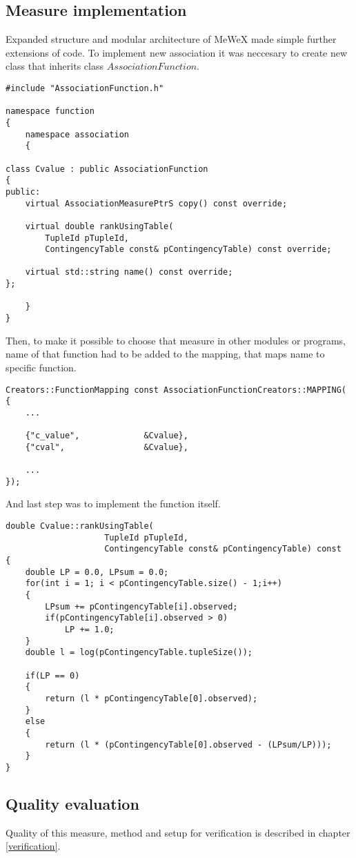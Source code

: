 \subsection{Measure implementation}
Expanded structure and modular architecture of MeWeX made simple further extensions of code. To implement new association 
it was neccesary to create new class that inherits class \(AssociationFunction\).
\begin{lstlisting}
#include "AssociationFunction.h"

namespace function
{
    namespace association
    {

class Cvalue : public AssociationFunction
{
public:
    virtual AssociationMeasurePtrS copy() const override;

    virtual double rankUsingTable(
        TupleId pTupleId,
        ContingencyTable const& pContingencyTable) const override;

    virtual std::string	name() const override;
};

    }
}
\end{lstlisting}
Then, to make it possible to choose that measure in other modules or programs, name of that function had to be added to the mapping,
that maps name to specific function.
\begin{lstlisting}
Creators::FunctionMapping const AssociationFunctionCreators::MAPPING(
{
    ...

    {"c_value",				&Cvalue},
    {"cval",				&Cvalue},

    ...
});
\end{lstlisting}
And last step was to implement the function itself.
\begin{lstlisting}
double Cvalue::rankUsingTable(
                    TupleId pTupleId, 
                    ContingencyTable const& pContingencyTable) const
{
    double LP = 0.0, LPsum = 0.0;
    for(int i = 1; i < pContingencyTable.size() - 1;i++)
    {
        LPsum += pContingencyTable[i].observed;
        if(pContingencyTable[i].observed > 0)
            LP += 1.0;
    }
    double l = log(pContingencyTable.tupleSize());

    if(LP == 0)
    {
        return (l * pContingencyTable[0].observed);
    }
    else
    {
        return (l * (pContingencyTable[0].observed - (LPsum/LP)));
    }
}
\end{lstlisting}

\subsection{Quality evaluation}
Quality of this measure, method and setup for verification is described in chapter \ref{verification}.